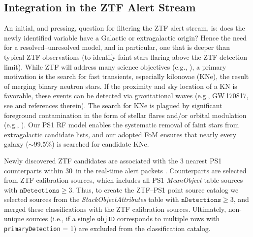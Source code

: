\documentclass[twocolumn, dvipdfmx]{aastex62}
\begin{document}
\begin{CJK*}{UTF8}{gbsn}
\subsection{Integration in the ZTF Alert Stream}

An initial, and pressing, question for filtering the ZTF alert stream, is:
does the newly identified variable have a Galactic or extragalactic origin?
Hence the need for a resolved--unresolved model, and in particular, one that
is deeper than typical ZTF observations (to identify faint stars flaring
above the ZTF detection limit). While ZTF will address many science
objectives (e.g., \citealt{Graham:18:ZTF}), a primary motivation is the
search for fast transients, especially kilonovae (KNe), the result of
merging binary neutron stars. If the proximity and sky location of a KN is
favorable, these events can be detected via gravitational waves (e.g.,
GW\,170817, see \citealt{Abbott17} and references therein). The search for
KNe is plagued by significant foreground contamination in the form of
stellar flares and/or orbital modulation (e.g., \citealt{Kulkarni06,
Berger12, Kasliwal16}). Our PS1 RF model enables the systematic removal of
faint stars from extragalactic candidate lists, and our adopted FoM ensures
that nearly every galaxy ($\sim$99.5\%) is searched for candidate KNe.

Newly discovered ZTF candidates are associated with the 3 nearest PS1
counterparts within 30\arcsec\ in the real-time alert packets
\citep{Masci:18:ZTF}. Counterparts are selected from ZTF calibration
sources, which includes all PS1 \textit{MeanObject} table sources with
$\mathtt{nDetections} \ge 3$. Thus, to create the ZTF--PS1 point source
catalog we selected sources from the \textit{StackObjectAttributes} table
with $\mathtt{nDetections} \ge 3$, and merged these classifications with the
ZTF calibration sources. Ultimately, non-unique sources (i.e., if a single
\texttt{objID} corresponds to multiple rows with \texttt{primaryDetection} =
1) are excluded from the classification catalog.


\end{CJK*}
\end{document}
